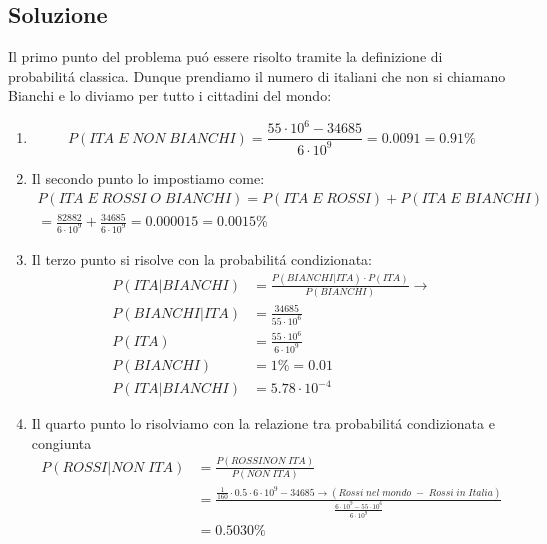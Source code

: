 \documentclass[paper=a4, fontsize=11pt]{scrartcl} %
\numberwithin{equation}{section} %
\numberwithin{figure}{section} %
\numberwithin{table}{section} %
\begin{document}
\subsection*{Soluzione}
Il primo punto del problema pu\'o essere risolto tramite la definizione di probabilit\'a classica. Dunque prendiamo il numero di italiani che non si chiamano Bianchi e lo diviamo per tutto i cittadini del mondo:
\begin{enumerate}
\item 
$$
P(ITA\; E\; NON\; BIANCHI) = \frac{55 \cdot 10^6 - 34685}{6 \cdot 10^9} = 0.0091 = 0.91\%
$$
\item Il secondo punto lo impostiamo come:
\begin{align}
P(ITA\; E\; ROSSI\; O\; BIANCHI) = P(ITA\; E\; ROSSI) + P(ITA\; E\; BIANCHI)\\
= \frac{82882}{6 \cdot 10^9} + \frac{34685}{6 \cdot 10^9} = 0.000015 = 0.0015\%
\end{align}
\item Il terzo punto si risolve con la probabilit\'a condizionata:
\begin{align}
P(ITA | BIANCHI) &= \frac{P(BIANCHI | ITA) \cdot P(ITA)}{P(BIANCHI)} \to\\
P(BIANCHI | ITA) &= \frac{34685}{55 \cdot 10^6}\\
P(ITA) &= \frac{55 \cdot 10^6}{6 \cdot 10^9}\\
P(BIANCHI) &= 1\% = 0.01\\
P(ITA | BIANCHI) &= 5.78 \cdot 10^{-4}
\end{align}
\item Il quarto punto lo risolviamo con la relazione tra probabilit\'a condizionata e congiunta
\begin{align}
P(ROSSI | NON\; ITA) &= \frac{P(ROSSI NON\; ITA)}{P(NON\; ITA)}\\ &=\frac{\frac{1}{160} \cdot 0.5 \cdot 6 \cdot 10^9 - 34685\to (Rossi\; nel\; mondo\; -\; Rossi\; in\; Italia)}{\frac{6 \cdot 10^9 - 55 \cdot 10^6}{6 \cdot 10^9}} \\
&= 0.5030\%
\end{align}
\end{enumerate}
\end{document}
